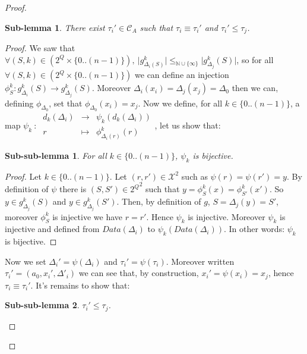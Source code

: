 \documentclass[a4paper,10pt]{report}
\newtheorem{slm}{Sub-lemma}[lm]
\newtheorem{sslm}{Sub-sub-lemma}[slm]
\theoremstyle{remark}
\newcommand{\dmap}[5]{
#1~:~\begin{array}{ccccc}
#2 &\to& #3 \\
#4  &\mapsto& #5
\end{array}}
\newcommand{\seg}[1]{\{#1\}}
\newcommand{\ts}{\seg{0 .. (n-1)}}
\newcommand{\C}{\mathcal{C}_{A}}
\newcommand{\Xa}{\mathcal{X}}
\begin{document}
\begin {proof}
\begin{slm}
  There exist $\tau_i' \in \C$ such that $\tau_i \equiv \tau_i'$ and $\tau_i' \leq \tau_j$.
\end{slm}
\begin{proof}
We saw that $\forall (S,k) \in (2^Q \times \ts),\ \lvert g^k_{\Delta_i(S)} \lvert \leq_{\mathbb N \cup \{\infty\}} \lvert g^k_{\Delta_j}(S) \lvert$, 
so for all $\forall (S,k) \in (2^Q \times \ts)$ we can define an injection $\phi^k_S: g^k_{\Delta_i}(S) \to g^k_{\Delta_j}(S)$. 
Moreover $\Delta_i(x_i)=\Delta_j(x_j)=\Delta_0$ then we can, defining $\phi_{\Delta_0}$, set that $\phi_{\Delta_0}(x_i) = x_j$.
Now we define, for all $k \in \ts$, a map $\dmap{\psi_k}{d_k(\Delta_i)}{\psi_k(d_k(\Delta_i))}{r}{\phi^k_{\Delta_i(r)}(r)}$, let us show that:
\begin{sslm}
  For all $k \in \ts$, $\psi_k$ is bijective.
\end{sslm}
\begin{proof}
Let $k \in \ts$.
Let $(r,r') \in \Xa^2 $ such as $\psi(r)= \psi(r') = y$.
By definition of $\psi$ there is $(S,S')\in {2^Q}^2$ such that  $y = \phi_S^k(x) =\phi^k_{S'}(x')$. So $y\in g^k_{\Delta_j}(S)$ and  $y\in g^k_{\Delta_j}(S')$.
Then, by definition of $g$,
$S=\Delta_j(y)=S'$, moreover $\phi^k_S$ is injective we have $ r=r'$.
Hence  $\psi_k$ is injective.
Moreover $\psi_k$ is injective and defined from $Data(\Delta_i)$ to $\psi_k(Data(\Delta_i))$.
In other words: $\psi_k$ is bijective.
\end{proof}
Now we set $\Delta_i'=\psi (\Delta_i)$ and $\tau_i'=\psi (\tau_i)$. 
Moreover written $ \tau_i'=(a_0,x_i',\Delta'_i)$ we can see that, by construction, $ x_i'=\psi(x_i)=x_j$, hence $\tau_i \equiv \tau_i'$.
It's remains to show that:
\begin{sslm}
  $\tau_i' \leq \tau_j$.
\end{sslm}


\end{proof}
\end{proof}
\end{document}
